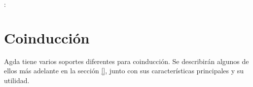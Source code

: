  \AgdaSymbol{:} 

 \AgdaSymbol{:} \AgdaSymbol{(} : \AgdaSymbol{)} \AgdaSymbol{$\rightarrow$}  

\AgdaFunction{$\_\sqcup\_$} \AgdaSymbol{:} \AgdaSymbol{(} \AgdaSymbol{:} \AgdaSymbol{)} \AgdaSymbol{$\rightarrow$} 

\section{Coinducción}\label{agda:coinduction}

Agda tiene varios soportes diferentes para coinducción. Se describirán algunos de ellos más adelante en la sección \ref{}, junto con sus características principales y su utilidad.